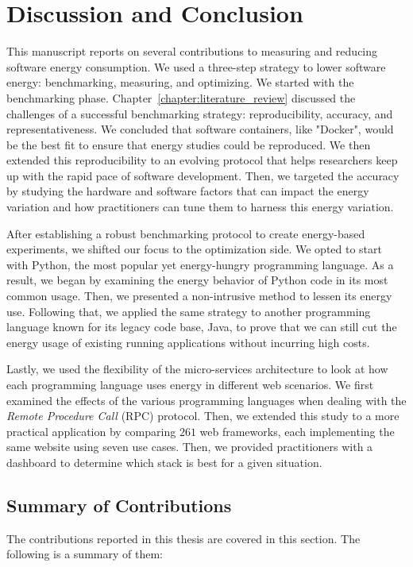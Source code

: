 \clearpage
\chapter{Discussion and Conclusion}
\label{chapter:conclusion}

This manuscript reports on several contributions to measuring and reducing software energy consumption.
We used a three-step strategy to lower software energy: benchmarking, measuring, and optimizing.
We started with the benchmarking phase.
Chapter~\ref{chapter:literature_review} discussed the challenges of a successful benchmarking strategy: reproducibility, accuracy, and representativeness.
We concluded that software containers, like "Docker", would be the best fit to ensure that energy studies could be reproduced.
We then extended this reproducibility to an evolving protocol that helps researchers keep up with the rapid pace of software development.
Then, we targeted the accuracy by studying the hardware and software factors that can impact the energy variation and how practitioners can tune them to harness this energy variation.

After establishing a robust benchmarking protocol to create energy-based experiments, we shifted our focus to the optimization side.
We opted to start with Python, the most popular yet energy-hungry programming language.
As a result, we began by examining the energy behavior of Python code in its most common usage. 
Then, we presented a non-intrusive method to lessen its energy use.
Following that, we applied the same strategy to another programming language known for its legacy code base, Java, to prove that we can still cut the energy usage of existing running applications without incurring high costs.

Lastly, we used the flexibility of the micro-services architecture to look at how each programming language uses energy in different web scenarios.
We first examined the effects of the various programming languages when dealing with the \emph{Remote Procedure Call} (RPC) protocol.
Then, we extended this study to a more practical application by comparing $261$ web frameworks, each implementing the same website using seven use cases.
Then, we provided practitioners with a dashboard to determine which stack is best for a given situation.


\section{Summary of Contributions}
\label{section:SummaryofContributions}
The contributions reported in this thesis are covered in this section.
The following is a summary of them:

